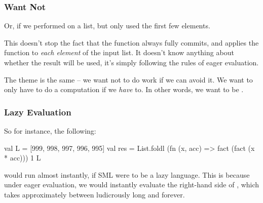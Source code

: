 \documentclass[aspectratio=169, handout]{beamer}
\begin{document}
\begin{frame}[fragile]
  \frametitle{Want Not}

  Or, if we performed  on a list, but only used the first few elements.

  \pause
  \vspace{\fill}

  This doesn't stop the fact that the  function always fully commits,
  and applies the function  to \textit{each element} of the input list.
  It doesn't know anything about whether the result will be used, it's simply
  following the rules of eager evaluation.

  \pause
  \vspace{\fill}

  The theme is the same -- we want not to do work if we can avoid it. We want
  to only have to do a computation if we \textit{have} to. In other words, we
  want to be .
\end{frame}

\begin{frame}[fragile]
  \frametitle{Lazy Evaluation}


  \pause
  \vspace{\fill}

  So for instance, the following:
  \begin{codeblock}
    val L = [999, 998, 997, 996, 995]
    val res =
      List.foldl (fn (x, acc) => fact (fact (x * acc))) 1 L
  \end{codeblock}
  \pause
  would run almost instantly, if SML were to be a lazy language. This is because
  under eager evaluation, we would instantly evaluate the right-hand side of
  , which takes approximately between ludicrously long and forever.
\end{frame}
\end{document}
